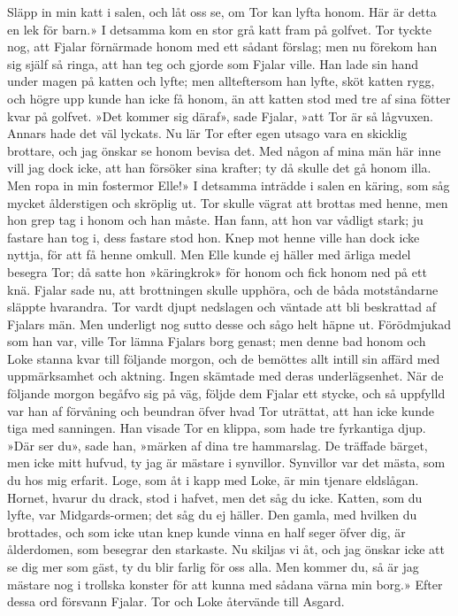 Släpp in min katt i salen, och låt oss se, om Tor kan lyfta honom. Här
är detta en lek för barn.» I detsamma kom en stor grå katt fram på
golfvet. Tor tyckte nog, att Fjalar förnärmade honom med ett sådant
förslag; men nu förekom han sig själf så ringa, att han teg och gjorde
som Fjalar ville. Han lade sin hand under magen på katten och lyfte; men
allteftersom han lyfte, sköt katten rygg, och högre upp kunde han icke
få honom, än att katten stod med tre af sina fötter kvar på golfvet.
»Det kommer sig däraf», sade Fjalar, »att Tor är så lågvuxen. Annars
hade det väl lyckats. Nu lär Tor efter egen utsago vara en skicklig
brottare, och jag önskar se honom bevisa det. Med någon af mina män här
inne vill jag dock icke, att han försöker sina krafter; ty då skulle det
gå honom illa. Men ropa in min fostermor Elle!» I detsamma inträdde i
salen en käring, som
\protect\hypertarget{lb1625905.xhtmlux5cux23start44}{}{}\protect\hypertarget{lb1625905.xhtmlux5cux23start44-a}{}{}\protect\hypertarget{lb1625905.xhtmlux5cux23start44-b}{}{}\protect\hypertarget{lb1625905.xhtmlux5cux23start44-c}{}{}\protect\hypertarget{lb1625905.xhtmlux5cux23start44-d}{}{}
såg mycket ålderstigen och skröplig ut. Tor skulle vägrat att brottas
med henne, men hon grep tag i honom och han måste. Han fann, att hon var
vådligt stark; ju fastare han tog i, dess fastare stod hon. Knep mot
henne ville han dock icke nyttja, för att få henne omkull. Men Elle
kunde ej häller med ärliga medel besegra Tor; då satte hon »käringkrok»
för honom och fick honom ned på ett knä. Fjalar sade nu, att brottningen
skulle upphöra, och de båda motståndarne släppte hvarandra. Tor vardt
djupt nedslagen och väntade att bli beskrattad af Fjalars män. Men
underligt nog sutto desse och sågo helt häpne ut. Förödmjukad som han
var, ville Tor lämna Fjalars borg genast; men denne bad honom och Loke
stanna kvar till följande morgon, och de bemöttes allt intill sin affärd
med uppmärksamhet och aktning. Ingen skämtade med deras underlägsenhet.
När de följande morgon begåfvo sig på väg, följde dem Fjalar ett stycke,
och så uppfylld var han af förvåning och beundran öfver hvad Tor
uträttat, att han icke kunde tiga med sanningen. Han visade Tor en
klippa, som hade tre fyrkantiga djup. »Där ser du», sade han, »märken af
dina tre hammarslag. De träffade bärget, men icke mitt hufvud, ty jag är
mästare i synvillor. Synvillor var det mästa, som du hos mig erfarit.
Loge, som åt i kapp med Loke, är min tjenare eldslågan. Hornet, hvarur
du drack, stod i hafvet, men det såg du icke. Katten, som du lyfte, var
Midgards-ormen; det såg du ej häller. Den gamla, med hvilken du
brottades, och som icke utan knep kunde vinna en half seger öfver dig,
är ålderdomen, som besegrar den starkaste. Nu skiljas vi åt, och jag
önskar icke att se dig mer som gäst, ty du blir farlig för oss alla. Men
kommer du, så är jag mästare nog i trollska konster för att kunna med
sådana värna min borg.» Efter dessa ord försvann Fjalar. Tor och Loke
återvände till Asgard.

